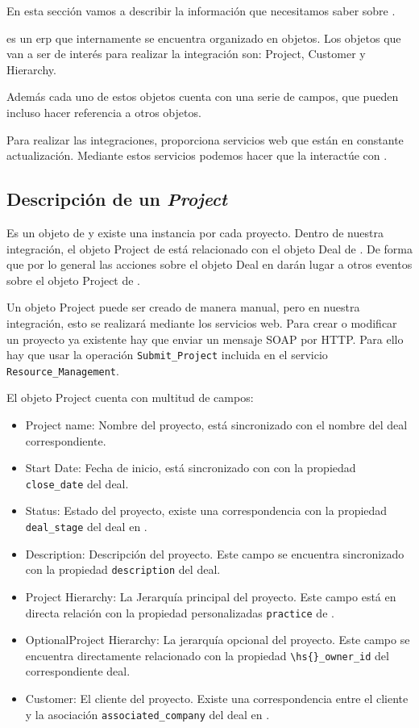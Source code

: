 En esta sección vamos a describir la información que necesitamos saber sobre \wday.

\wday{} es un \acrshort{erp} que internamente se encuentra organizado en objetos. Los objetos que van a ser de interés para realizar la integración son:
Project, Customer y Hierarchy.

Además cada uno de estos objetos cuenta con una serie de campos, que pueden incluso hacer referencia a otros objetos.


Para realizar las integraciones, \wday{} proporciona servicios web que están en constante actualización.
Mediante estos servicios podemos hacer que la \iface{} interactúe con \wday.



\subsection{Descripción de un \textit{Project}}
Es un objeto de \wday{} y existe una instancia por cada proyecto. Dentro de nuestra integración, 
el objeto Project de \wday{} está relacionado con el objeto Deal de \hs. 
De forma que por lo general las acciones sobre el objeto Deal en \hs{} darán lugar a otros eventos
 sobre el objeto Project de \wday.
 
Un objeto Project puede ser creado de manera manual, pero en nuestra integración, esto se realizará mediante los servicios web.
Para crear o modificar un proyecto ya existente hay que enviar un mensaje SOAP por HTTP. 
Para ello hay que usar la operación \verb|Submit_Project|  incluida en el servicio \verb|Resource_Management|.

El objeto Project cuenta con multitud de campos: 

\begin{itemize}
\item Project name: Nombre del proyecto, está sincronizado con el nombre del deal correspondiente.
\item Start Date: Fecha de inicio, está sincronizado con con la propiedad \verb|close_date| del deal.
\item Status: Estado del proyecto, existe una correspondencia con la propiedad \verb|deal_stage| del deal en \hs.
\item Description: Descripción del proyecto. Este campo se encuentra sincronizado con la propiedad \verb|description| del deal.

\item Project Hierarchy: La Jerarquía principal del proyecto. Este campo está en directa relación con la propiedad personalizadas
\verb|practice| de \hs.
\item OptionalProject Hierarchy: La jerarquía opcional del proyecto. Este campo se encuentra directamente relacionado con la propiedad \verb|\hs{}_owner_id| del correspondiente deal.
\item Customer: El cliente del proyecto. Existe una correspondencia entre el cliente y la asociación \verb|associated_company| del deal en \hs.

\end{itemize}



